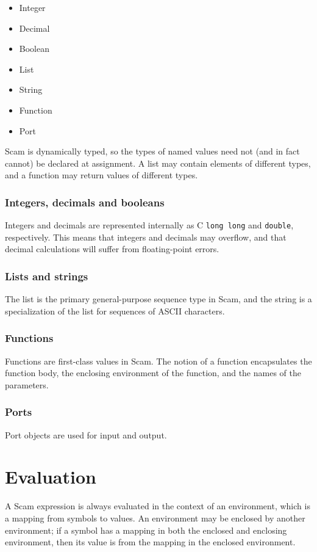 \documentclass{article}
\newcommand{\inlinecode}{\texttt}
\begin{document}
\begin{itemize}
\item{Integer}
\item{Decimal}
\item{Boolean}
\item{List}
\item{String}
\item{Function}
\item{Port}
\end{itemize}

Scam is dynamically typed, so the types of named values need not (and in fact cannot) be declared at assignment. A list may contain elements of different types, and a function may return values of different types.

\subsubsection{Integers, decimals and booleans}
Integers and decimals are represented internally as C \inlinecode{long long} and \inlinecode{double}, respectively. This means that integers and decimals may overflow, and that decimal calculations will suffer from floating-point errors.

\subsubsection{Lists and strings}
The list is the primary general-purpose sequence type in Scam, and the string is a specialization of the list for sequences of ASCII characters.

\subsubsection{Functions}
Functions are first-class values in Scam. The notion of a function encapsulates the function body, the enclosing environment of the function, and the names of the parameters.

\subsubsection{Ports}
Port objects are used for input and output.

\section{Evaluation}
A Scam expression is always evaluated in the context of an environment, which is a mapping from symbols to values. An environment may be enclosed by another environment; if a symbol has a mapping in both the enclosed and enclosing environment, then its value is from the mapping in the enclosed environment.
\end{document}
